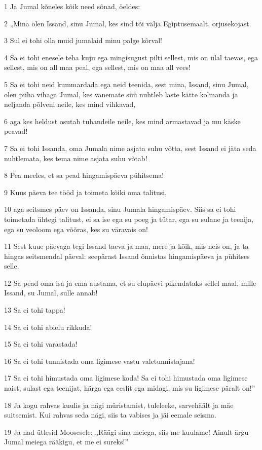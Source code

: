\par 1 Ja Jumal kõneles kõik need sõnad, öeldes:
\par 2 „Mina olen Issand, sinu Jumal, kes sind tõi välja Egiptusemaalt, orjusekojast.
\par 3 Sul ei tohi olla muid jumalaid minu palge kõrval!
\par 4 Sa ei tohi enesele teha kuju ega mingisugust pilti sellest, mis on ülal taevas, ega sellest, mis on all maa peal, ega sellest, mis on maa all vees!
\par 5 Sa ei tohi neid kummardada ega neid teenida, sest mina, Issand, sinu Jumal, olen püha vihaga Jumal, kes vanemate süü nuhtleb laste kätte kolmanda ja neljanda põlveni neile, kes mind vihkavad,
\par 6 aga kes heldust osutab tuhandeile neile, kes mind armastavad ja mu käske peavad!
\par 7 Sa ei tohi Issanda, oma Jumala nime asjata suhu võtta, sest Issand ei jäta seda nuhtlemata, kes tema nime asjata suhu võtab!
\par 8 Pea meeles, et sa pead hingamispäeva pühitsema!
\par 9 Kuus päeva tee tööd ja toimeta kõiki oma talitusi,
\par 10 aga seitsmes päev on Issanda, sinu Jumala hingamispäev. Siis sa ei tohi toimetada ühtegi talitust, ei sa ise ega su poeg ja tütar, ega su sulane ja teenija, ega su veoloom ega võõras, kes su väravais on!
\par 11 Sest kuue päevaga tegi Issand taeva ja maa, mere ja kõik, mis neis on, ja ta hingas seitsmendal päeval: seepärast Issand õnnistas hingamispäeva ja pühitses selle.
\par 12 Sa pead oma isa ja ema austama, et su elupäevi pikendataks sellel maal, mille Issand, su Jumal, sulle annab!
\par 13 Sa ei tohi tappa!
\par 14 Sa ei tohi abielu rikkuda!
\par 15 Sa ei tohi varastada!
\par 16 Sa ei tohi tunnistada oma ligimese vastu valetunnistajana!
\par 17 Sa ei tohi himustada oma ligimese koda! Sa ei tohi himustada oma ligimese naist, sulast ega teenijat, härga ega eeslit ega midagi, mis su ligimese päralt on!”
\par 18 Ja kogu rahvas kuulis ja nägi müristamist, tuleleeke, sarvehäält ja mäe suitsemist. Kui rahvas seda nägi, siis ta vabises ja jäi eemale seisma.
\par 19 Ja nad ütlesid Moosesele: „Räägi sina meiega, siis me kuulame! Ainult ärgu Jumal meiega rääkigu, et me ei sureks!”

